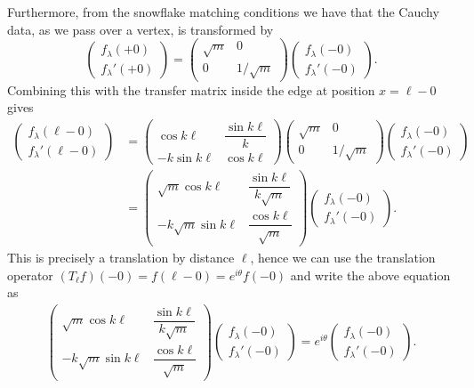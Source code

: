 Furthermore, from the snowflake matching conditions we have that the Cauchy data, as we pass over a vertex, is transformed by
\[
  \begin{pmatrix}
    f_\lambda(+0) \\
    f_\lambda'(+0)
  \end{pmatrix}
  =
  \begin{pmatrix}
    \sqrt{m} & 0 \\
    0 & 1/\sqrt{m}
  \end{pmatrix}
  \begin{pmatrix}
    f_\lambda(-0) \\
    f_\lambda'(-0)
  \end{pmatrix}.
\]
Combining this with the transfer matrix inside the edge at position $x=\ell-0$ gives
\begin{align*}
  \begin{pmatrix}
    f_\lambda(\ell-0) \\
    f_\lambda'(\ell-0)
  \end{pmatrix}
  &=
  \begin{pmatrix}
    \cos k\ell & \dfrac{\sin k\ell}{k} \\
    -k \sin k\ell & \cos k\ell
  \end{pmatrix}
  \begin{pmatrix}
    \sqrt{m} & 0 \\
    0 & 1/\sqrt{m}
  \end{pmatrix}
  \begin{pmatrix}
    f_\lambda(-0) \\
    f_\lambda'(-0)
  \end{pmatrix} \\
  &=
  \begin{pmatrix}
    \sqrt{m}\cos k\ell & \dfrac{\sin k\ell}{k\sqrt{m}} \\
    -k\sqrt{m} \sin k\ell & \dfrac{\cos k\ell}{\sqrt{m}}
  \end{pmatrix}
  \begin{pmatrix}
    f_\lambda(-0) \\
    f_\lambda'(-0)
  \end{pmatrix}.
\end{align*}
This is precisely a translation by distance $\ell$, hence we can use the translation operator $(T_\ell f)(-0) = f(\ell-0) = e^{i\theta} f(-0)$ and write the above equation as
\begin{align*}
  \begin{pmatrix}
    \sqrt{m}\cos k\ell & \dfrac{\sin k\ell}{k\sqrt{m}} \\
    -k\sqrt{m} \sin k\ell & \dfrac{\cos k\ell}{\sqrt{m}}
  \end{pmatrix}
  \begin{pmatrix}
    f_\lambda(-0) \\
    f_\lambda'(-0)
  \end{pmatrix}
  =
  e^{i\theta}
  \begin{pmatrix}
    f_\lambda(-0) \\
    f_\lambda'(-0)
  \end{pmatrix}.
\end{align*}
